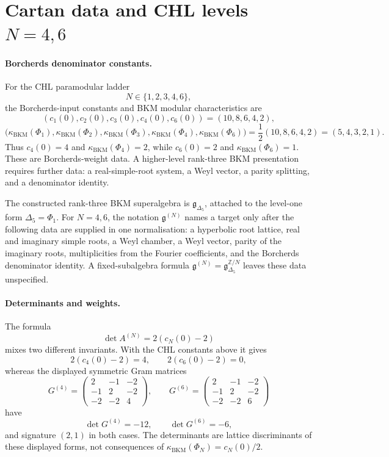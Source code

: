 
\providecommand{\kBKM}{\kappa_{\mathrm{BKM}}}
\providecommand{\kch}{\kappa_{\mathrm{ch}}}
\providecommand{\kcat}{\kappa_{\mathrm{cat}}}
\providecommand{\kfib}{\kappa_{\mathrm{fiber}}}
\providecommand{\fgDel}{\mathfrak{g}_{\Delta_5}}
\providecommand{\ZZ}{\mathbb{Z}}
\providecommand{\QQ}{\mathbb{Q}}
\providecommand{\LIIN}{\Lambda^{2,1}_{\mathrm{II},N}}

\section*{Cartan data and CHL levels $N=4,6$}
\label{sec:cartan-N46-obstruction}

\paragraph{Borcherds denominator constants.}
For the CHL paramodular ladder
\[
  N \in \{1,2,3,4,6\},
\]
the Borcherds-input constants and BKM modular characteristics are
\[
  (c_1(0),c_2(0),c_3(0),c_4(0),c_6(0))
  = (10,8,6,4,2),
\]
\[
  \bigl(\kBKM(\Phi_1),\kBKM(\Phi_2),\kBKM(\Phi_3),
  \kBKM(\Phi_4),\kBKM(\Phi_6)\bigr)
  = \frac{1}{2}(10,8,6,4,2)
  = (5,4,3,2,1).
\]
Thus $c_4(0)=4$ and $\kBKM(\Phi_4)=2$, while $c_6(0)=2$ and
$\kBKM(\Phi_6)=1$. These are Borcherds-weight data. A higher-level
rank-three BKM presentation requires further data: a real-simple-root
system, a Weyl vector, a parity splitting, and a denominator identity.

The constructed rank-three BKM superalgebra is $\fgDel$, attached to
the level-one form $\Delta_5=\Phi_1$.
For $N=4,6$, the notation $\mathfrak{g}^{(N)}$ names a target only
after the following data are supplied in one normalisation: a hyperbolic
root lattice, real and imaginary simple roots, a Weyl chamber, a Weyl
vector, parity of the imaginary roots, multiplicities from the Fourier
coefficients, and the Borcherds denominator identity. A fixed-subalgebra
formula $\mathfrak{g}^{(N)}=\fgDel^{\ZZ/N}$ leaves these data
unspecified.

\paragraph{Determinants and weights.}
The formula
\[
  \det A^{(N)} = 2(c_N(0)-2)
\]
mixes two different invariants. With the CHL constants above it gives
\[
  2(c_4(0)-2)=4,\qquad 2(c_6(0)-2)=0,
\]
whereas the displayed symmetric Gram matrices
\[
  G^{(4)} =
  \begin{pmatrix}
    2 & -1 & -2\\
    -1 & 2 & -2\\
    -2 & -2 & 4
  \end{pmatrix},
  \qquad
  G^{(6)} =
  \begin{pmatrix}
    2 & -1 & -2\\
    -1 & 2 & -2\\
    -2 & -2 & 6
  \end{pmatrix}
\]
have
\[
  \det G^{(4)}=-12,\qquad \det G^{(6)}=-6,
\]
and signature $(2,1)$ in both cases. The determinants are lattice
discriminants of these displayed forms, not consequences of
$\kBKM(\Phi_N)=c_N(0)/2$.

